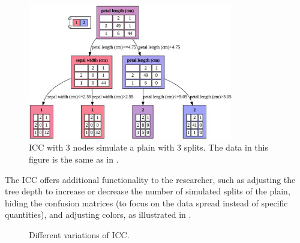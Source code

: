\documentclass[11pt]{article}
\begin{document}
\begin{figure}[H]
\centering
\includegraphics[width=0.8\textwidth]{icc.png}

\caption{ICC with 3 nodes simulate a plain with 3 splits. The data in this figure is the same as in .}
\label{fig:fig2}

\end{figure}

The ICC offers additional functionality to the researcher, such as adjusting the tree depth to increase or decrease the number of simulated splits of the plain, hiding the confusion matrices (to focus on the data spread instead of specific quantities), and adjusting colors, as illustrated in  .

\begin{figure}[H]
        	\centering
           \caption{Different variations of ICC.}
           \label{fig:fig3}
\end{figure}    
\end{document}
